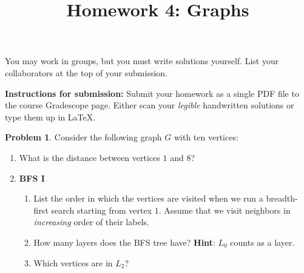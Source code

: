 \documentclass[10pt]{article}
\title{Homework 4: Graphs}
\date{}
\theoremstyle{definition}
\newtheorem{problem}{Problem}
\begin{document}
\maketitle
\thispagestyle{fancy}

\noindent You may work in groups, but you must write solutions yourself. List your collaborators at the top of your submission. 

\vspace{1em}

\noindent \textbf{Instructions for submission:} Submit your homework as a single PDF file to the course Gradescope page. Either scan your \emph{legible} handwritten solutions or type them up in \LaTeX. 



\begin{problem}
    Consider the following graph $G$ with ten vertices:
    \begin{center}
    \end{center}

    \begin{enumerate}[label=(\alph*)]
        \item What is the distance between vertices $1$ and $8$?
        \item \textbf{BFS I} 
        \begin{enumerate}[label=(\roman*)]
            \item List the order in which the vertices are visited when we run a breadth-first search starting from vertex $1$. Assume that we visit neighbors in \emph{increasing} order of their labels.
            \item How many layers does the BFS tree have? \textbf{Hint}: $L_0$ counts as a layer.
            \item Which vertices are in $L_2$?
        \end{enumerate}


\end{enumerate}
\end{problem}
\end{document}
